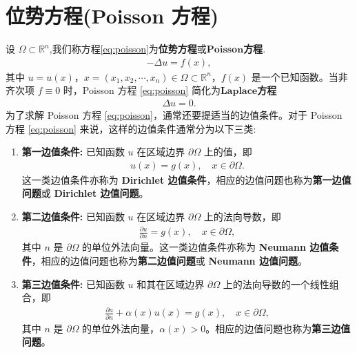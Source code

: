 \documentclass[../main.tex]{subfiles} %
\begin{document}
\chapter{位势方程(Poisson 方程)}

\begin{definition}
设 $\Omega\subset \mathbb{R}^n$,我们称方程\eqref{eq:poisson}为\textbf{位势方程}或$\mathbf{Poisson}$\textbf{方程}.
\begin{align}
-\Delta u = f(x), \label{eq:poisson}
\end{align}
其中 $u=u(x)$，$x=(x_1,x_2,\cdots,x_n)\in\Omega\subset\mathbb{R}^n$，$f(x)$ 是一个已知函数。当非齐次项 $f\equiv 0$ 时，Poisson 方程 \eqref{eq:poisson} 简化为$\mathbf{Laplace}$\textbf{方程}
\begin{align}
\Delta u = 0. \label{eq:laplace}
\end{align}
为了求解 Poisson 方程 \eqref{eq:poisson}，通常还要提适当的边值条件。对于 Poisson 方程 \eqref{eq:poisson} 来说，这样的边值条件通常分为以下三类:
\begin{enumerate}[(1)]
\item \textbf{第一边值条件:} 已知函数 $u$ 在区域边界 $\partial\Omega$ 上的值，即
\begin{align*}
u(x) = g(x), \quad x\in\partial\Omega.
\end{align*}
这一类边值条件亦称为\textbf{ Dirichlet 边值条件}，相应的边值问题也称为\textbf{第一边值问题}或 \textbf{Dirichlet 边值问题}。

\item \textbf{第二边值条件:} 已知函数 $u$ 在区域边界 $\partial\Omega$ 上的法向导数，即
\begin{align*}
\frac{\partial u}{\partial n} = g(x), \quad x\in\partial\Omega,
\end{align*}
其中 $n$ 是 $\partial\Omega$ 的单位外法向量。这一类边值条件亦称为 \textbf{Neumann 边值条件}，相应的边值问题也称为\textbf{第二边值问题}或 \textbf{Neumann 边值问题}。

\item \textbf{第三边值条件:} 已知函数 $u$ 和其在区域边界 $\partial\Omega$ 上的法向导数的一个线性组合，即
\begin{align*}
\frac{\partial u}{\partial n} + \alpha(x)u(x) = g(x), \quad x\in\partial\Omega,
\end{align*}
其中 $n$ 是 $\partial\Omega$ 的单位外法向量，$\alpha(x)>0$。相应的边值问题也称为\textbf{第三边值问题}。
\end{enumerate}
\end{definition}




















\end{document}
